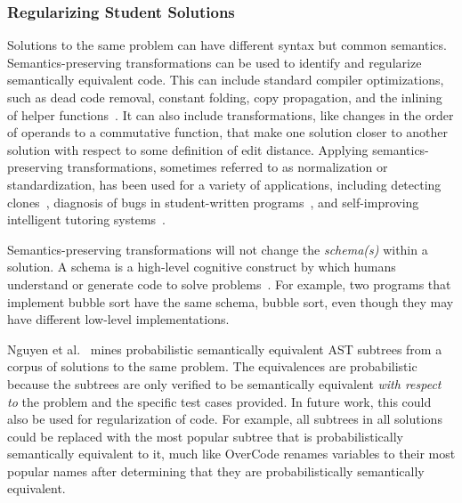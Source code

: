 \subsubsection{Regularizing Student Solutions}


Solutions to the same problem can have different syntax but common semantics. Semantics-preserving transformations can be used to identify and regularize semantically equivalent code. This can include standard compiler optimizations, such as dead code removal, constant folding, copy propagation, and the inlining of helper functions~\cite{rivers2015data}. It can also include transformations, like changes in the order of operands to a commutative function, that make one solution closer to another solution with respect to some definition of edit distance. Applying semantics-preserving transformations, sometimes referred to as normalization or standardization, has been used for a variety of applications, including detecting clones~\cite{baxter,CCFinder}, diagnosis of bugs in student-written programs~\cite{xutransformation}, and self-improving intelligent tutoring systems~\cite{rivers2015data}. 

Semantics-preserving transformations will not change the {\it schema(s)} within a solution. A schema is a high-level cognitive construct by which humans understand or generate code to solve problems~\cite{Soloway1984}. For example, two programs that implement bubble sort have the same schema, bubble sort, even though they may have different low-level implementations. 

Nguyen et al.~\cite{codewebs} mines probabilistic semantically equivalent AST subtrees from a corpus of solutions to the same problem. The equivalences are probabilistic because the subtrees are only verified to be semantically equivalent {\it with respect to} the problem and the specific test cases provided. In future work, this could also be used for regularization of code. For example, all subtrees in all solutions could be replaced with the most popular subtree that is probabilistically semantically equivalent to it, much like OverCode renames variables to their most popular names after determining that they are probabilistically semantically equivalent. 

